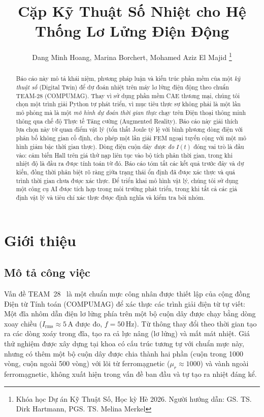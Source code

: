 \documentclass[a4paper, 10pt, conference]{ieeeconf}
\title{\LARGE \bf
Cặp Kỹ Thuật Số Nhiệt cho Hệ Thống Lơ Lửng Điện Động
}
\author{ Dang Minh Hoang, Marina Borchert, Mohamed Aziz El Majid
\thanks{Khóa học Dự án Kỹ Thuật Số, Học kỳ Hè 2026. Người hướng dẫn: GS. TS. Dirk Hartmann, PGS. TS. Melina Merkel}
}
\theoremstyle{remark}
\begin{document}
\maketitle
\thispagestyle{plain}
\pagestyle{plain}


\begin{abstract}
Báo cáo này mô tả khái niệm, phương pháp luận và kiến trúc phần mềm của một
\emph{kỹ thuật số} (Digital Twin) để dự đoán nhiệt trên máy lơ lửng điện động
theo chuẩn TEAM-28 (COMPUMAG). Thay vì sử dụng phần mềm CAE thương mại, chúng tôi
chọn một trình giải Python tự phát triển, vì mục tiêu thực sự không phải là một
lần mô phỏng mà là một \emph{mô hình dự đoán thời gian thực} chạy trên Điện thoại
thông minh thông qua chế độ Thực tế Tăng cường (Augmented Reality). Báo cáo này
giải thích lựa chọn này từ quan điểm vật lý (tổn thất Joule tỷ lệ với bình phương
dòng điện với phân bố không gian cố định, cho phép một lần giải FEM ngoại tuyến
cộng với một mô hình giảm bậc thời gian thực). Dòng điện cuộn dây \emph{được đo}
$I(t)$ đóng vai trò là đầu vào: cảm biến Hall trên giá thử nạp liên tục vào bộ
tích phân thời gian, trong khi nhiệt độ là đầu ra được tính toán từ đó. Báo cáo
tóm tắt các kết quả trước đây và dự kiến, đồng thời phân biệt rõ ràng giữa trạng
thái ổn định đã được xác thực và quá trình thời gian chưa được xác thực. Để triển
khai mô hình vật lý, chúng tôi sử dụng một công cụ AI được tích hợp trong môi
trường phát triển, trong khi tất cả các giả định vật lý và tiêu chí xác thực được
định nghĩa và kiểm tra bởi nhóm.
\end{abstract}



\section{Giới thiệu}
\label{sec:intro}

\subsection{Mô tả công việc}
Vấn đề TEAM~28~\cite{team28} là một chuẩn mực công nhân được thiết lập của cộng
đồng Điện từ Tính toán (COMPUMAG) để xác thực các trình giải điện từ tự viết: Một
đĩa nhôm dẫn điện lơ lửng phía trên một bộ cuộn dây được chạy bằng dòng xoay chiều
($I_{\mathrm{rms}}\approx5\,\mathrm{A}$ được đo, $f=50\,\mathrm{Hz}$). Từ thông
thay đổi theo thời gian tạo ra các dòng xoáy trong đĩa, tạo ra cả lực nâng (lơ
lửng) và mất mát nhiệt. Giá thử nghiệm được xây dựng tại khoa có cấu trúc tương
tự với chuẩn mực này, nhưng có thêm một bộ cuộn dây được chia thành hai phần
(cuộn trong 1000 vòng, cuộn ngoài 500 vòng) với lõi từ ferromạgnetic
($\mu_r\approx1000$) và vành ngoài ferromạgnetic, không xuất hiện trong vấn đề ban
đầu và tự tạo ra nhiệt đáng kể.
\end{document}
